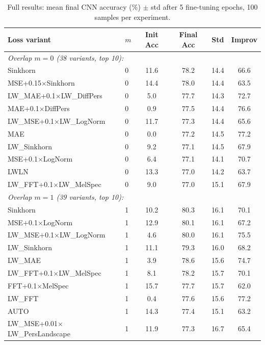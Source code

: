 \documentclass{article}
\begin{document}
\begin{table}[h]
  \centering
  \caption{Full results: mean final CNN accuracy (\%) $\pm$ std after
  5 fine-tuning epochs, 100 samples per experiment.}
  \label{tab:full-results}
  \scriptsize
  \begin{tabular}{llcccc}
    \toprule
    Loss variant & $m$ & Init Acc & Final Acc & Std & Improv \\
    \midrule
    \multicolumn{6}{l}{\textit{Overlap $m=0$ (38 variants, top 10):}} \\
    Sinkhorn & 0 & 11.6 & 78.2 & 14.4 & 66.6 \\
    MSE+0.15$\times$Sinkhorn & 0 & 14.4 & 78.0 & 14.4 & 63.5 \\
    LW\_MAE+0.1$\times$LW\_DiffPers & 0 & 5.0 & 77.7 & 14.3 & 72.7 \\
    MAE+0.1$\times$DiffPers & 0 & 0.9 & 77.5 & 14.4 & 76.6 \\
    LW\_MSE+0.1$\times$LW\_LogNorm & 0 & 11.7 & 77.3 & 14.4 & 65.6 \\
    MAE & 0 & 0.0 & 77.2 & 14.5 & 77.2 \\
    LW\_Sinkhorn & 0 & 9.2 & 77.1 & 14.5 & 67.9 \\
    MSE+0.1$\times$LogNorm & 0 & 6.4 & 77.1 & 14.1 & 70.7 \\
    LWLN & 0 & 13.3 & 77.0 & 14.2 & 63.7 \\
    LW\_FFT+0.1$\times$LW\_MelSpec & 0 & 9.0 & 77.0 & 15.1 & 67.9 \\
    \midrule
    \multicolumn{6}{l}{\textit{Overlap $m=1$ (39 variants, top 10):}} \\
    Sinkhorn & 1 & 10.2 & 80.3 & 16.1 & 70.1 \\
    MSE+0.1$\times$LogNorm & 1 & 12.9 & 80.1 & 16.1 & 67.2 \\
    LW\_MSE+0.1$\times$LW\_LogNorm & 1 & 4.6 & 80.0 & 16.1 & 75.5 \\
    LW\_Sinkhorn & 1 & 11.1 & 79.3 & 16.0 & 68.2 \\
    LW\_MAE & 1 & 3.9 & 78.6 & 15.6 & 74.7 \\
    LW\_FFT+0.1$\times$LW\_MelSpec & 1 & 8.1 & 78.2 & 15.7 & 70.1 \\
    FFT+0.1$\times$MelSpec & 1 & 15.7 & 77.7 & 15.7 & 62.0 \\
    LW\_FFT & 1 & 0.4 & 77.6 & 15.6 & 77.2 \\
    AUTO & 1 & 14.3 & 77.4 & 15.1 & 63.2 \\
    LW\_MSE+0.01$\times$LW\_PersLandscape & 1 & 11.9 & 77.3 & 16.7 & 65.4 \\

\end{tabular}
\end{table}
\end{document}

